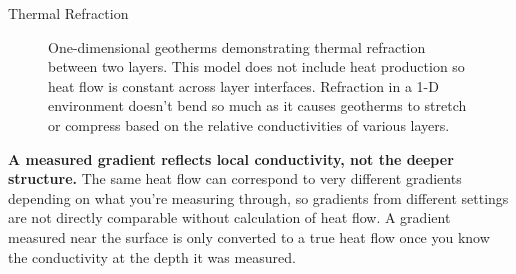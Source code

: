 \begin{activity}[Warm-up]{Thermal Refraction}
\begin{figure}[h]
  \caption{One-dimensional geotherms demonstrating thermal refraction between two layers. This model does not include heat production so heat flow is constant across layer interfaces.  Refraction in a 1-D environment doesn't bend so much as it causes geotherms to stretch or compress based on the relative conductivities of various layers.}
  \label{fig:refraction}
\end{figure}

\textbf{A measured gradient reflects local conductivity, not the deeper structure.} The same heat flow can correspond to very different gradients depending on what you're measuring through, so gradients from different settings are not directly comparable without calculation of heat flow.  A gradient measured near the surface is only converted to a true heat flow once you know the conductivity at the depth it was measured. 

\end{activity}
